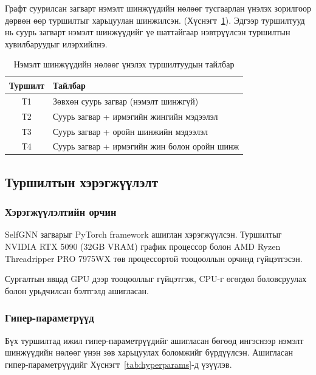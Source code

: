\documentclass[conference]{IEEEtran}
\begin{document}
Графт суурилсан загварт нэмэлт шинжүүдийн нөлөөг тусгаарлан үнэлэх зорилгоор дөрвөн өөр туршилтыг харьцуулан шинжилсэн. (Хүснэгт~\ref{tab:configs}). Эдгээр туршилтууд нь суурь загварт нэмэлт шинжүүдийг үе шаттайгаар нэвтрүүлсэн туршилтын хувилбаруудыг илэрхийлнэ.

\begin{table}[h]
\centering
\renewcommand{\arraystretch}{1.3}
\setlength{\tabcolsep}{10pt}
\caption{Нэмэлт шинжүүдийн нөлөөг үнэлэх туршилтуудын тайлбар}
\renewcommand{\arraystretch}{1.3}
\setlength{\tabcolsep}{6pt}
\label{tab:configs}
\begin{tabular}{|c|l|}
\hline
\textbf{Туршилт} & \textbf{Тайлбар} \\
\hline
Т1 & Зөвхөн суурь загвар (нэмэлт шинжгүй) \\
\hline
Т2 & Суурь загвар + ирмэгийн жингийн мэдээлэл \\
\hline
Т3 & Суурь загвар + оройн шинжийн мэдээлэл \\
\hline
Т4 & Суурь загвар + ирмэгийн жин болон оройн шинж \\
\hline
\end{tabular}
\end{table}

\subsection{Туршилтын хэрэгжүүлэлт}
 
\subsubsection{Хэрэгжүүлэлтийн орчин}
 
SelfGNN загварыг PyTorch framework ашиглан хэрэгжүүлсэн. Туршилтыг NVIDIA RTX 5090 (32GB VRAM) график процессор болон AMD Ryzen Threadripper PRO 7975WX төв процессортой тооцооллын орчинд гүйцэтгэсэн.

Сургалтын явцад GPU дээр тооцооллыг гүйцэтгэж, CPU-г өгөгдөл боловсруулах болон урьдчилсан бэлтгэлд ашигласан.

\subsubsection{Гипер-параметрүүд}
 
Бүх туршилтад ижил гипер-параметрүүдийг ашигласан бөгөөд ингэснээр нэмэлт шинжүүдийн нөлөөг үнэн зөв харьцуулах боломжийг бүрдүүлсэн. Ашигласан гипер-параметрүүдийг Хүснэгт~\ref{tab:hyperparams}-д үзүүлэв.
\end{document}
